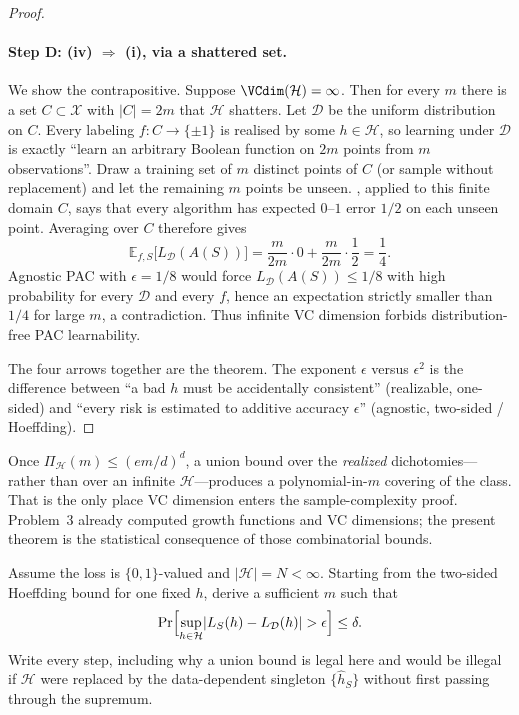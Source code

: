 \begin{proof}
\paragraph{Step D: (iv) $\Rightarrow$ (i), via a shattered set.}
We show the contrapositive. Suppose $\VCdim(\mathcal{H})=\infty$. Then for every $m$ there is a set $C\subset\mathcal{X}$ with $\lvert C\rvert=2m$ that $\mathcal{H}$ shatters. Let $\mathcal{D}$ be the uniform distribution on $C$. Every labeling $f:C\to\{\pm1\}$ is realised by some $h\in\mathcal{H}$, so learning under $\mathcal{D}$ is exactly ``learn an arbitrary Boolean function on $2m$ points from $m$ observations''. Draw a training set of $m$ distinct points of $C$ (or sample without replacement) and let the remaining $m$ points be unseen. , applied to this finite domain $C$, says that every algorithm has expected $0$--$1$ error $1/2$ on each unseen point. Averaging over $C$ therefore gives
\[
\mathbb{E}_{f,S}\bigl[L_{\mathcal{D}}(A(S))\bigr]
=
\frac{m}{2m}\cdot 0+\frac{m}{2m}\cdot\frac12
=
\frac14.
\]
Agnostic PAC with $\epsilon=1/8$ would force $L_{\mathcal{D}}(A(S))\le 1/8$ with high probability for every $\mathcal{D}$ and every $f$, hence an expectation strictly smaller than $1/4$ for large $m$, a contradiction. Thus infinite VC dimension forbids distribution-free PAC learnability.

The four arrows together are the theorem. The exponent $\epsilon$ versus $\epsilon^2$ is the difference between ``a bad $h$ must be accidentally consistent'' (realizable, one-sided) and ``every risk is estimated to additive accuracy $\epsilon$'' (agnostic, two-sided / Hoeffding).
\end{proof}

\begin{remark}
Once $\Pi_{\mathcal{H}}(m)\le(em/d)^d$, a union bound over the \emph{realized} dichotomies---rather than over an infinite $\mathcal{H}$---produces a polynomial-in-$m$ covering of the class. That is the only place VC dimension enters the sample-complexity proof. Problem~3 already computed growth functions and VC dimensions; the present theorem is the statistical consequence of those combinatorial bounds.
\end{remark}

\begin{exercise}
\label{ex:mlu-union-hoeffding}
Assume the loss is $\{0,1\}$-valued and $\lvert\mathcal{H}\rvert=N<\infty$. Starting from the two-sided Hoeffding bound for one fixed $h$, derive a sufficient $m$ such that
\[
\Pr\Bigl[\sup_{h\in\mathcal{H}}\lvert L_S(h)-L_{\mathcal{D}}(h)\rvert>\epsilon\Bigr]\le\delta.
\]
Write every step, including why a union bound is legal here and would be illegal if $\mathcal{H}$ were replaced by the data-dependent singleton $\{\widehat{h}_S\}$ without first passing through the supremum.
\end{exercise}

